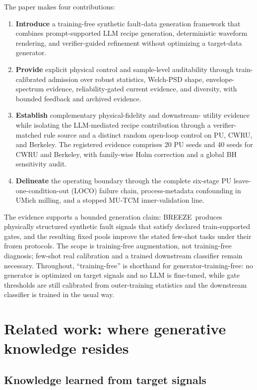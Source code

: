 \documentclass[a4paper,fleqn]{cas-sc}
\newcommand{\breeze}{BREEZE}
\begin{document}
The paper makes four contributions:
\begin{enumerate}
  \item \textbf{Introduce} a training-free synthetic fault-data generation
  framework that combines prompt-supported LLM recipe generation,
  deterministic waveform rendering, and verifier-guided refinement without
  optimizing a target-data generator.
  \item \textbf{Provide} explicit physical control and sample-level
  auditability through train-calibrated admission over robust statistics,
  Welch-PSD shape, envelope-spectrum evidence, reliability-gated current
  evidence, and diversity, with bounded feedback and archived evidence.
  \item \textbf{Establish} complementary physical-fidelity and downstream-
  utility evidence while isolating the LLM-mediated recipe contribution through
  a verifier-matched rule source and a distinct random open-loop control on PU,
  CWRU, and Berkeley. The registered evidence comprises 20 PU seeds and 40
  seeds for CWRU and Berkeley, with family-wise Holm correction and a global BH
  sensitivity audit.
  \item \textbf{Delineate} the operating boundary through the complete six-stage
  PU leave-one-condition-out (LOCO) failure chain, process-metadata confounding
  in UMich milling, and a stopped MU-TCM inner-validation line.
\end{enumerate}

The evidence supports a bounded generation claim: \breeze\ produces physically
structured synthetic fault signals that satisfy declared train-supported gates,
and the resulting fixed pools improve the stated few-shot tasks under their
frozen protocols. The scope is training-free augmentation, not training-free
diagnosis; few-shot real calibration and a trained downstream classifier remain
necessary. Throughout, ``training-free'' is shorthand for
generator-training-free: no generator is optimized on target signals and no
LLM is fine-tuned, while gate thresholds are still calibrated from
outer-training statistics and the downstream classifier is trained in the
usual way.

\section{Related work: where generative knowledge resides}
\label{sec:related}

\subsection{Knowledge learned from target signals}
\end{document}
